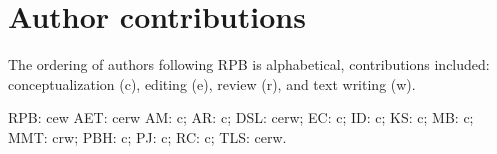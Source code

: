 \documentclass[11pt,]{article}
\begin{document}
\hypertarget{author-contributions}{%
\section{Author contributions}\label{author-contributions}}

The ordering of authors following RPB is alphabetical, contributions
included: conceptualization (c), editing (e), review (r), and text
writing (w).

RPB: cew AET: cerw AM: c; AR: c; DSL: cerw; EC: c; ID: c; KS: c; MB: c;
MMT: crw; PBH: c; PJ: c; RC: c; TLS: cerw.





\newpage
\singlespacing
\renewcommand\refname{References}

\end{document}

